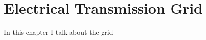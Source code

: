 \setchapterpreamble[u]{\margintoc}
\chapter{Electrical Transmission Grid}

In this chapter I talk about the grid